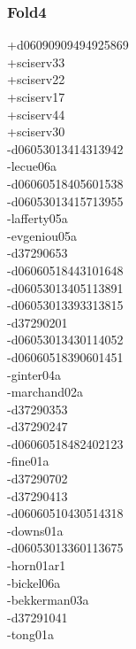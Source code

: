 \begin{multicols}{4}
\subsubsection*{Fold4}
+d06090909494925869\\
+sciserv33\\
+sciserv22\\
+sciserv17\\
+sciserv44\\
+sciserv30\\
-d06053013414313942\\
-lecue06a\\
-d06060518405601538\\
-d06053013415713955\\
-lafferty05a\\
-evgeniou05a\\
-d37290653\\
-d06060518443101648\\
-d06053013405113891\\
-d06053013393313815\\
-d37290201\\
-d06053013430114052\\
-d06060518390601451\\
-ginter04a\\
-marchand02a\\
-d37290353\\
-d37290247\\
-d06060518482402123\\
-fine01a\\
-d37290702\\
-d37290413\\
-d06060510430514318\\
-downs01a\\
-d06053013360113675\\
-horn01ar1\\
-bickel06a\\
-bekkerman03a\\
-d37291041\\
-tong01a\\

\end{multicols}
